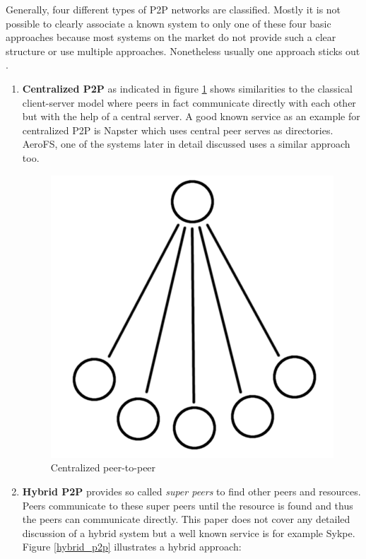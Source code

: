 Generally, four different types of P2P networks are classified. Mostly it is not possible to clearly associate a known system to only one of these four basic approaches because most systems on the market do not provide such a clear structure or use multiple approaches. Nonetheless usually one approach sticks out \cite{ptp-introduction:tomptp}.
\begin{enumerate}
	\item \textbf{Centralized P2P} as indicated in figure \ref{centralized_p2p} shows similarities to the classical client-server model where peers in fact communicate directly with each other but with the help of a central server. A good known service as an example for centralized P2P is Napster which uses central peer serves as directories. AeroFS, one of the systems later in detail discussed uses a similar approach too.
	\begin{figure}[H]
		\begin{center}
		\includegraphics[scale=0.2]{Talk5/centralized_p2p.PNG}
		\end{center}
		\caption{Centralized peer-to-peer}
		\label{centralized_p2p}
	\end{figure}
	\item \textbf{Hybrid P2P} provides so called \textit{super peers} to find other peers and resources. Peers communicate to these super peers until the resource is found and thus the peers can communicate directly. This paper does not cover any detailed discussion of a hybrid system but a well known service is for example Sykpe. Figure \ref{hybrid_p2p} illustrates a hybrid approach:

\end{enumerate}
